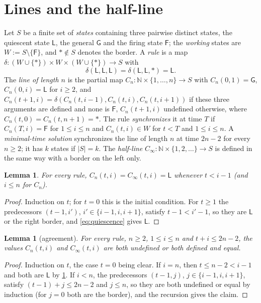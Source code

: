 \documentclass[3p]{elsarticle}
\newtheorem{lemma}[theorem]{Lemma}
\theoremstyle{definition}
\newcommand{\Lq}{\mathsf L}
\newcommand{\Gq}{\mathsf G}
\newcommand{\Fq}{\mathsf F}
\begin{document}
\section{Lines and the half-line}\label{sec:prelim}

Let $S$ be a finite set of \emph{states} containing three pairwise distinct
states, the quiescent state $\Lq$, the general $\Gq$ and the firing state
$\Fq$; the \emph{working} states are $W:=S\setminus\{\Fq\}$, and $\ast\notin
S$ denotes the border. A \emph{rule} is a map
$\delta:(W\cup\{\ast\})\times W\times(W\cup\{\ast\})\to S$ with
\begin{equation}\label{eq:quiescence}
\delta(\Lq,\Lq,\Lq)=\delta(\Lq,\Lq,\ast)=\Lq .
\end{equation}
The \emph{line of length $n$} is the partial map $C_n:\mathbb
N\times\{1,\dots,n\}\to S$ with $C_n(0,1)=\Gq$, $C_n(0,i)=\Lq$ for $i\ge2$,
and $C_n(t+1,i)=\delta(C_n(t,i-1),C_n(t,i),C_n(t,i+1))$ if these three
arguments are defined and none is $\Fq$, $C_n(t+1,i)$ undefined otherwise,
where $C_n(t,0)=C_n(t,n+1)=\ast$. The rule \emph{synchronizes} it at time $T$
if $C_n(T,i)=\Fq$ for $1\le i\le n$ and $C_n(t,i)\in W$ for $t<T$ and $1\le
i\le n$. A \emph{minimal-time solution} synchronizes the line of length $n$ at
time $2n-2$ for every $n\ge2$; it has $k$ states if $|S|=k$. The
\emph{half-line} $C_\infty:\mathbb N\times\{1,2,\dots\}\to S$ is defined in
the same way with a border on the left only.

\begin{lemma}\label{lem:lightcone}
For every rule, $C_n(t,i)=C_\infty(t,i)=\Lq$ whenever $t<i-1$ (and $i\le n$
for $C_n$).
\end{lemma}

\begin{proof}
Induction on $t$; for $t=0$ this is the initial condition. For $t\ge1$ the
predecessors $(t-1,i')$, $i'\in\{i-1,i,i+1\}$, satisfy $t-1<i'-1$, so they are
$\Lq$ or the right border, and \eqref{eq:quiescence} gives $\Lq$.
\end{proof}

\begin{lemma}[agreement]\label{lem:agree}
For every rule, $n\ge2$, $1\le i\le n$ and $t+i\le 2n-2$, the values
$C_n(t,i)$ and $C_\infty(t,i)$ are both undefined or both defined and equal.
\end{lemma}

\begin{proof}
Induction on $t$, the case $t=0$ being clear. If $i=n$, then $t\le n-2<i-1$
and both are $\Lq$ by \cref{lem:lightcone}. If $i<n$, the predecessors
$(t-1,j)$, $j\in\{i-1,i,i+1\}$, satisfy $(t-1)+j\le 2n-2$ and $j\le n$, so
they are both undefined or equal by induction (for $j=0$ both are the border),
and the recursion gives the claim.
\end{proof}
\end{document}
